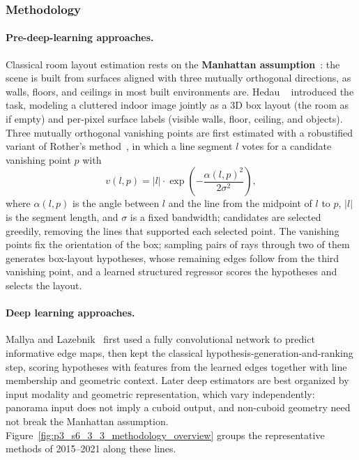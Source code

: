 \subsubsection{Methodology}

\paragraph{Pre-deep-learning approaches.}
Classical room layout estimation rests on the \textbf{Manhattan assumption}~\cite{CoughlanY99}: the scene is built from surfaces aligned with three mutually orthogonal directions, as walls, floors, and ceilings in most built environments are.
Hedau \etal~\cite{HedauHF09} introduced the task, modeling a cluttered indoor image jointly as a 3D box layout (the room as if empty) and per-pixel surface labels (visible walls, floor, ceiling, and objects).
Three mutually orthogonal vanishing points are first estimated with a robustified variant of Rother's method~\cite{Rother02}, in which a line segment $l$ votes for a candidate vanishing point $p$ with
\begin{equation}
v(l,p) = |l| \cdot \exp\!\left(-\frac{\alpha(l,p)^2}{2\sigma^2}\right),
\end{equation}
where $\alpha(l,p)$ is the angle between $l$ and the line from the midpoint of $l$ to $p$, $|l|$ is the segment length, and $\sigma$ is a fixed bandwidth; candidates are selected greedily, removing the lines that supported each selected point.
The vanishing points fix the orientation of the box; sampling pairs of rays through two of them generates box-layout hypotheses, whose remaining edges follow from the third vanishing point, and a learned structured regressor scores the hypotheses and selects the layout.

\paragraph{Deep learning approaches.}
Mallya and Lazebnik~\cite{MallyaL15} first used a fully convolutional network to predict informative edge maps, then kept the classical hypothesis-generation-and-ranking step, scoring hypotheses with features from the learned edges together with line membership and geometric context.
Later deep estimators are best organized by input modality and geometric representation, which vary independently: panorama input does not imply a cuboid output, and non-cuboid geometry need not break the Manhattan assumption. Figure~\ref{fig:p3_s6_3_3_methodology_overview} groups the representative methods of 2015--2021 along these lines.

